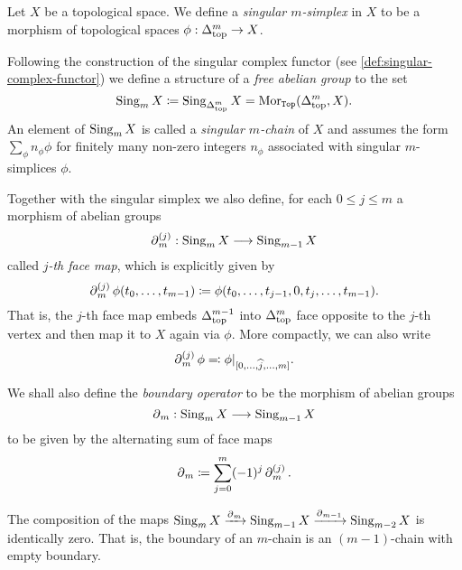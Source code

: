\begin{definition}
    \label{def:singular-simplex}
    Let \(X\) be a topological space. We define a \emph{singular \(m\)-simplex} in
    \(X\) to be a morphism of topological spaces \(\phi: \Delta_{\text{top}}^m \to X\).

    Following the construction of the singular complex functor (see
    \cref{def:singular-complex-functor}) we define a structure of a \emph{free
        abelian group} to the set
    \[
        \operatorname{Sing}_m X \coloneq \operatorname{Sing}_{\Delta_{\text{top}}^m} X = \operatorname{Mor}_{{\texttt{Top}}}(\Delta_{\text{top}}^m, X).
    \]
    An element of \(\operatorname{Sing}_m X\) is called a \emph{singular \(m\)-chain} of \(X\) and
    assumes the form \(\sum_{\phi} n_{\phi} \phi\) for finitely many non-zero
    integers \(n_{\phi}\) associated with singular \(m\)-simplices \(\phi\).

    Together with the singular simplex we also define, for each \(0 \leq j \leq m\)
    a morphism of abelian groups
    \[
        \operatorname{\partial}_m^{(j)}: \operatorname{Sing}_m X \longrightarrow \operatorname{Sing}_{m-1} X
    \]
    called \emph{\(j\)-th face map}, which is explicitly given by
    \[
        \operatorname{\partial}_m^{(j)} \phi(t_0, \dots, t_{m-1})
        \coloneq \phi(t_0, \dots, t_{j-1}, 0, t_j, \dots, t_{m-1}).
    \]
    That is, the \(j\)-th face map embeds \(\Delta_{\text{top}}^{m-1}\) into \(\Delta_{\text{top}}^m\)
    face opposite to the \(j\)-th vertex and then map it to \(X\) again via
    \(\phi\). More compactly, we can also write
    \[
        \operatorname{\partial}_m^{(j)} \phi \eqqcolon \phi|_{[0, \dots, \widehat j, \dots, m]}.
    \]

    We shall also define the \emph{boundary operator} to be the morphism
    of abelian groups
    \[
        \operatorname{\partial}_m: \operatorname{Sing}_m X \longrightarrow \operatorname{Sing}_{m-1} X
    \]
    to be given by the alternating sum of face maps
    \[
        \operatorname{\partial}_m \coloneq \sum_{j=0}^m (-1)^j \operatorname{\partial}_m^{(j)}.
    \]
\end{definition}

\begin{proposition}
    \label{prop:boundary-squared-is-zero}
    The composition of the maps
    \(\operatorname{Sing}_m X \xrightarrow{\operatorname{\partial}_m} \operatorname{Sing}_{m-1} X \xrightarrow{\operatorname{\partial}_{m-1}}
    \operatorname{Sing}_{m-2} X\) is identically zero. That is, the boundary of an \(m\)-chain is
    an \((m-1)\)-chain with empty boundary.
\end{proposition}

